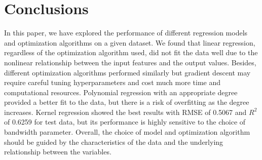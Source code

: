 \documentclass{article}
\begin{document}
\section{Conclusions}
\label{sec:conclusions}
In this paper, we have explored the performance of different regression models and optimization algorithms on a given dataset.
We found that linear regression, regardless of the optimization algorithm used, did not fit the data well due to the nonlinear relationship between the input features and the output values.
Besides, different optimization algorithms performed similarly but gradient descent may require careful tuning hyperparameters and cost much more time and computational resources.
Polynomial regression with an appropriate degree provided a better fit to the data, but there is a risk of overfitting as the degree increases.
Kernel regression showed the best results with RMSE of 0.5067 and $R^2$ of 0.6259 for test data, but its performance is highly sensitive to the choice of bandwidth parameter.
Overall, the choice of model and optimization algorithm should be guided by the characteristics of the data and the underlying relationship between the variables.

\printbibliography



\end{document}
